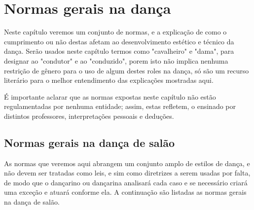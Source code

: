 
\chapter{Normas gerais na dança}
Neste capítulo veremos um conjunto de normas, e a explicação de como o cumprimento
ou não destas afetam ao desenvolvimento estético e técnico da dança. Serão usados
neste capítulo termos como "cavalheiro" e "dama", para designar ao "condutor" e ao "conduzido",
porem isto não implica nenhuma restrição de gênero para o uso de algum destes roles na dança,
só são um recurso literário para o melhor entendimento das explicações mostradas aqui.
\begin{lattention}
É importante aclarar
que as normas expostas neste capítulo não estão regulamentadas por nenhuma entidade; assim, estas
refletem, o ensinado por distintos professores,
interpretações pessoais  e deduções. 
\end{lattention}

\section{Normas gerais na dança de salão}
As normas que veremos aqui abrangem um conjunto amplo de estilos de 
dança, e não devem ser
tratadas como leis, e sim como diretrizes a serem usadas por falta, de modo que 
o dançarino ou dançarina analisará cada caso e se necessário criará uma exceção e atuará conforme ela.
A continuação são listadas as normas gerais na dança de salão.\\

